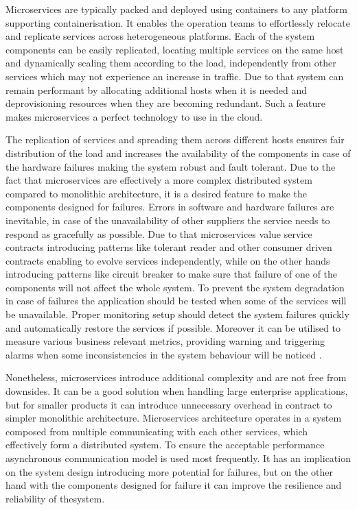 Microservices are typically packed and deployed using containers to any platform supporting containerisation. It enables the operation teams to effortlessly relocate and replicate services across heterogeneous platforms. Each of the system components can be easily replicated, locating multiple services on the same host and dynamically scaling them according to the load, independently from other services which may not experience an increase in traffic. Due to that system can remain performant by allocating additional hosts when it is needed and deprovisioning resources when they are becoming redundant. Such a feature makes microservices a perfect technology to use in the cloud.

The replication of services and spreading them across different hosts ensures fair distribution of the load and increases the availability of the components in case of the hardware failures making the system robust and fault tolerant. Due to the fact that microservices are effectively a more complex distributed system compared to monolithic architecture, it is a desired feature to make the components designed for failures. Errors in software and hardware failures are inevitable, in case of the unavailability of other suppliers the service needs to respond as gracefully as possible. Due to that microservices value service contracts introducing patterns like tolerant reader and other consumer driven contracts enabling to evolve services independently, while on the other hands introducing patterns like circuit breaker to make sure that failure of one of the components will not affect the whole system. To prevent the system degradation in case of failures the application should be tested when some of the services will be unavailable. Proper monitoring setup should detect the system failures quickly and automatically restore the services if possible. Moreover it can be utilised to measure various business relevant metrics, providing warning and triggering alarms when some inconsistencies in the system behaviour will be noticed \cite{MicroservicesHowToMakeYourApplicationScale}.

Nonetheless, microservices introduce additional complexity and are not free from downsides. It can be a good solution when handling large enterprise applications, but for smaller products it can introduce unnecessary overhead in contract to simpler monolithic architecture. Microservices architecture operates in a system composed from multiple communicating with each other services, which effectively form a distributed system. To ensure the acceptable performance asynchronous communication model is used most frequently. It has an implication on the system design introducing more potential for failures, but on the other hand with the components designed for failure it can improve the resilience and reliability of thesystem.

